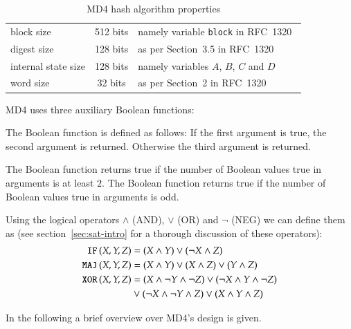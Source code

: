 \begin{table}[h]
  \begin{center}
    \begin{tabular}{lcl}
      block size           & 512 bits       & namely variable \texttt{block} in RFC~1320~\cite{rfc1320} \\
      digest size          & 128 bits       & as per Section~3.5 in RFC~1320~\cite{rfc1320} \\
      internal state size  & 128 bits       & namely variables $A$, $B$, $C$ and $D$ \\
      word size            & 32 bits        & as per Section~2 in RFC~1320~\cite{rfc1320} \\
    \end{tabular}
    \caption{MD4 hash algorithm properties}
    \label{tab:md4}
  \end{center}
\end{table}

MD4 uses three auxiliary Boolean functions:
\begin{defi}
  The Boolean  function is defined as follows:
  If the first argument is true, the second argument is returned.
  Otherwise
  the third argument is returned.

  The Boolean  function returns true if the number
  of Boolean values true in arguments is at least $2$.
  The Boolean  function returns true if the number
  of Boolean values true in arguments is odd.
\end{defi}

Using the logical operators $\land$ (AND), $\lor$ (OR) and $\neg$ (NEG)
we can define them as (see section~\ref{sec:sat-intro} for a thorough
discussion of these operators):
\begin{align}
  \operatorname{\texttt{IF\,}}(X,Y,Z) &= (X \land Y) \lor (\neg X \land Z) \\
  \operatorname{\texttt{MAJ\,}}(X,Y,Z) &= (X \land Y) \lor (X \land Z) \lor (Y \land Z) \\
  \operatorname{\texttt{XOR\,}}(X,Y,Z) &= (X \land \neg Y \land \neg Z) \lor (\neg X \land Y \land \neg Z) \nonumber\\
              &\lor (\neg X \land \neg Y \land Z) \lor (X \land Y \land Z)
\end{align}


In the following a brief overview over MD4's design is given.

